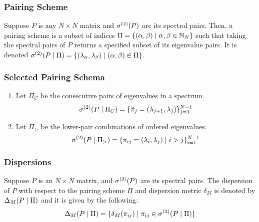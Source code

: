 \begin{frame} \frametitle{Pairing Scheme}

\begin{alertblock}{}
Suppose $P$ is any $N \times N$ matrix and ${\sigma^{(2)}}(P)$ are its spectral pairs. Then, a pairing scheme is a subset of indices $\Pi = \{(\alpha,\beta) \mid \alpha, \beta \in \mathbb{N}_N\}$ such that taking the spectral pairs of $P$ returns
a specified subset of its eigenvalue pairs. It is denoted ${\sigma^{(2)}}(P \mid \Pi) = \{(\lambda_{\alpha},\lambda_{\beta}) \mid ({\alpha},{\beta}) \in \Pi\}$.
\end{alertblock}

\end{frame}
\begin{frame} \frametitle{Selected Pairing Schema}


\begin{enumerate}
  \item Let $\Pi_C$ be the consecutive pairs of eigenvalues in a spectrum.
    $${\sigma^{(2)}}(P \mid \Pi_C) = \{{\tilde{\pi}}_{j} = (\lambda_{j + 1},\lambda_j)\}_{j = 1}^{N-1}$$
  \item Let $\Pi_>$ be the lower-pair combinations of ordered eigenvalues.
    $${\sigma^{(2)}}(P \mid \Pi_>) = \{\pi_{ij} = (\lambda_i,\lambda_j) \mid i > j\}_{i = 1}^{N-1}$$
\end{enumerate}

\end{frame}

\begin{frame} \frametitle{Dispersions}

\begin{alertblock}{}
Suppose $P$ is an $N \times N$ matrix, and ${\sigma^{(2)}}(P)$ are its spectral pairs.
The dispersion of $P$ with respect to the pairing scheme $\Pi$ and dispersion metric $\delta_M$ is denoted by $\Delta_M(P \mid \Pi)$ and it is given by the following:
$$\Delta_M(P \mid \Pi) = \{\delta_M({\pi_{ij}}) \mid {\pi_{ij}} \in {\sigma^{(2)}}(P \mid \Pi)\}$$
\end{alertblock}

\end{frame}

